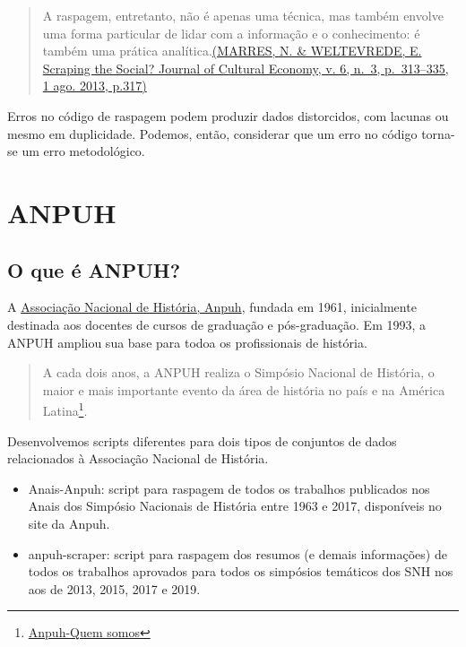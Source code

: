 \documentclass[
]{book}
\begin{document}
\begin{quote}
A raspagem, entretanto, não é apenas uma técnica, mas também envolve uma forma particular de lidar com a informação e o conhecimento: é também uma prática analítica.\href{https://www.tandfonline.com/doi/abs/10.1080/17530350.2013.772070}{(MARRES, N. \& WELTEVREDE, E. Scraping the Social? Journal of Cultural Economy, v. 6, n.~3, p.~313--335, 1 ago. 2013, p.317)}
\end{quote}

Erros no código de raspagem podem produzir dados distorcidos, com lacunas ou mesmo em duplicidade. Podemos, então, considerar que um erro no código torna-se um erro metodológico.

\hypertarget{anpuh}{%
\chapter{ANPUH}\label{anpuh}}

\hypertarget{o-que-uxe9-anpuh}{%
\section{O que é ANPUH?}\label{o-que-uxe9-anpuh}}

A \href{https://anpuh.org.br/index.php}{Associação Nacional de História, Anpuh}, fundada em 1961, inicialmente destinada aos docentes de cursos de graduação e pós-graduação. Em 1993, a ANPUH ampliou sua base para todoa os profissionais de história.

\begin{quote}
A cada dois anos, a ANPUH realiza o Simpósio Nacional de História, o maior e mais importante evento da área de história no país e na América Latina\footnote{\href{https://anpuh.org.br/index.php/quem-somos}{Anpuh-Quem somos}}.
\end{quote}

Desenvolvemos scripts diferentes para dois tipos de conjuntos de dados relacionados à Associação Nacional de História.

\begin{itemize}
\item
  Anais-Anpuh: script para raspagem de todos os trabalhos publicados nos Anais dos Simpósio Nacionais de História entre 1963 e 2017, disponíveis no site da Anpuh.
\item
  anpuh-scraper: script para raspagem dos resumos (e demais informações) de todos os trabalhos aprovados para todos os simpósios temáticos dos SNH nos aos de 2013, 2015, 2017 e 2019.
\end{itemize}
\end{document}
